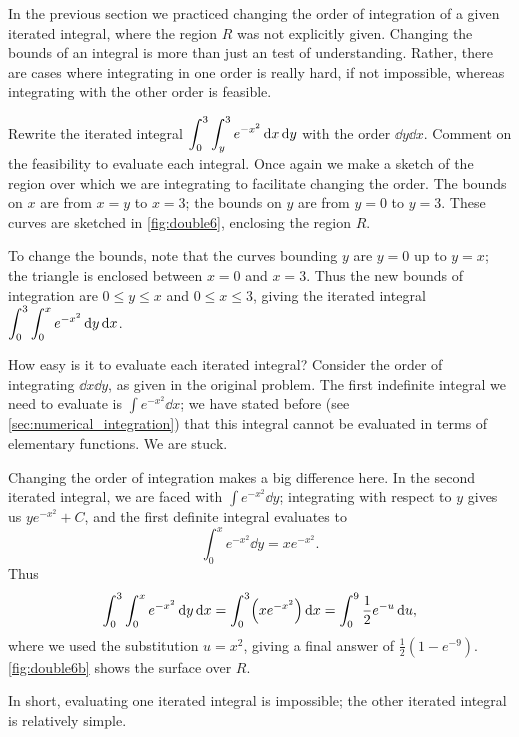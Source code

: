 %

In the previous section we practiced changing the order of integration of a given iterated integral, where the region $R$ was not explicitly given. Changing the bounds of an integral is more than just an test of understanding. Rather, there are cases where integrating in one order is really hard, if not impossible, whereas integrating with the other order is feasible.

\begin{example}\label{ex_double6}%
Rewrite the iterated integral $\displaystyle \int_0^3\int_y^3 e^{-x^2}\operatorname{d}\! x\operatorname{d}\! y$ with the order $\dd y\dd x$. Comment on the feasibility to evaluate each integral.
\solution
Once again we make a sketch of the region over which we are integrating to facilitate changing the order. The bounds on $x$ are from $x=y$ to $x=3$; the bounds on $y$ are from $y=0$ to $y=3$. These curves are sketched in \autoref{fig:double6}, enclosing the region $R$.

To change the bounds, note that the curves bounding $y$ are $y=0$ up to $y=x$; the triangle is enclosed between $x=0$ and $x=3$. Thus the new bounds of integration are $0\leq y\leq x$ and $0\leq x\leq 3$, giving the iterated integral $\displaystyle \int_0^3\int_0^x e^{-x^2}\operatorname{d}\! y\operatorname{d}\! x$.

How easy is it to evaluate each iterated integral? Consider the order of integrating $\dd x\dd y$, as given in the original problem. The first indefinite integral we need to evaluate is $\int e^{-x^2}\dd x$; we have stated before (see \autoref{sec:numerical_integration}) that this integral cannot be evaluated in terms of elementary functions. We are stuck.

Changing the order of integration makes a big difference here. In the second iterated integral, we are faced with $\int e^{-x^2}\dd y$; integrating with respect to $y$ gives us $ye^{-x^2}+C$, and the first definite integral evaluates to 
\[\int_0^x e^{-x^2}\dd y = xe^{-x^2}.\]
Thus 
\[
 \int_0^3\int_0^x e^{-x^2}\operatorname{d}\! y\operatorname{d}\! x
 = \int_0^3\Bigl(xe^{-x^2}\Bigr)\operatorname{d}\! x
 = \int_0^9\frac12 e^{-u}\operatorname{d}\! u,
\]
where we used the substitution $u=x^2$, giving a final answer of $\frac12(1-e^{-9})%
$. \autoref{fig:double6b} shows the surface over $R$.

In short, evaluating one iterated integral is impossible; the other iterated integral is relatively simple.
\end{example}


